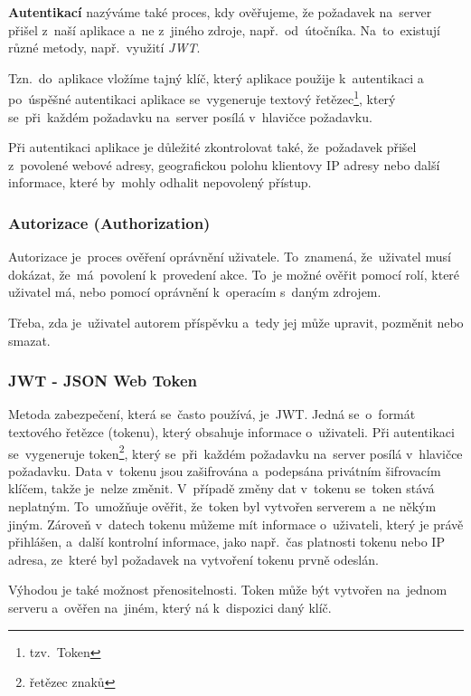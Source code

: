 \documentclass[14pt,a4paper]{article}
\begin{document}
            \textbf{Autentikací} nazýváme také proces, kdy ověřujeme, že požadavek na~server přišel z~naší aplikace a~ne z~jiného zdroje,
            např.~od~útočníka. Na~to~existují různé metody, např.~využití \emph{JWT}.

            Tzn.~do~aplikace vložíme tajný klíč, který aplikace použije k~autentikaci a po~úspěšné autentikaci aplikace se~vygeneruje textový řetězec\footnote{tzv.~Token},
            který se~při~každém požadavku na~server posílá v~hlavičce požadavku.

            Při autentikaci aplikace je důležité zkontrolovat také, že~požadavek přišel z~povolené webové adresy, geografickou polohu klientovy IP adresy
            nebo další informace, které by~mohly odhalit nepovolený přístup.

            \subsubsection{Autorizace (Authorization)}
            Autorizace je~proces ověření oprávnění uživatele. To~znamená, že~uživatel musí dokázat, že~má~povolení k~provedení akce.
            To~je možné ověřit pomocí rolí, které uživatel má, nebo pomocí oprávnění k~operacím s~daným zdrojem.

            Třeba, zda je~uživatel autorem příspěvku a~tedy jej může upravit, pozměnit nebo smazat.

            \subsubsection{JWT - JSON Web Token}
            Metoda zabezpečení, která se~často používá, je~JWT. Jedná se~o~formát textového řetězce (tokenu), který obsahuje informace o~uživateli.
            Při autentikaci se~vygeneruje token\footnote{řetězec znaků}, který se~při~každém požadavku na~server posílá v~hlavičce požadavku.
            Data v~tokenu jsou zašifrována a~podepsána privátním šifrovacím klíčem, takže je~nelze změnit. V~případě změny dat v~tokenu se~token stává neplatným.
            To~umožňuje ověřit, že~token byl vytvořen serverem a~ne někým jiným. Zároveň v~datech tokenu můžeme mít informace o~uživateli, který je právě přihlášen,
            a~další kontrolní informace, jako např.~čas platnosti tokenu nebo IP adresa, ze~které byl požadavek na vytvoření tokenu prvně odeslán.

            Výhodou je také možnost přenositelnosti. Token může být vytvořen na~jednom serveru a~ověřen na~jiném, který ná k~dispozici daný klíč.
\end{document}
